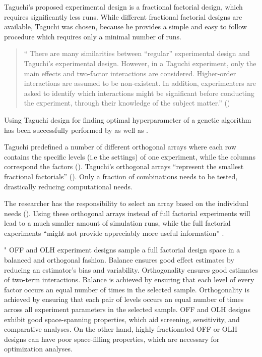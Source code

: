 Taguchi's proposed experimental design is a fractional factorial design, which requires significantly less runs. While different fractional factorial designs are available, Taguchi was chosen, because he provides a simple and easy to follow procedure which requires only a minimal number of runs.

\begin{quote}
	\begin{em}
		\enquote{ There are many similarities between “regular” experimental design and Taguchi's experimental design. However, in a Taguchi experiment, only the main effects and two-factor interactions are considered. Higher-order interactions are assumed to be non-existent. In addition, experimenters are asked to identify which interactions might be significant before conducting the experiment, through their knowledge of the subject matter.} (\cite{yang_design_2009})
	\end{em}
\end{quote}

Using Taguchi design for finding optimal hyperparameter of a genetic algorithm has been successfully performed by \cite{dao_maximising_2016} as well as \cite{naruka_parameter_2019}.

Taguchi predefined a number of different orthogonal arrays where each row contains the specific levels (i.e the settings) of one experiment, while the columns correspond the factors (\cite{li_taguchi_2021}). Taguchi's orthogonal arrays \enquote{represent the smallest fractional factorials} (\cite{roy_primer_1990}). Only a fraction of combinations needs to be tested, drastically reducing computational needs.

The researcher has the responsibility to select an array based on the individual needs (\cite{li_taguchi_2021}).
Using these orthogonal arrays instead of full factorial experiments will lead to a much smaller amount of simulation runs, while the full factorial experiments \enquote{might not provide appreciably more useful information} \cite{roy_primer_1990}.

" OFF and OLH experiment designs sample a full factorial design space in a balanced and orthogonal fashion. Balance ensures good effect estimates by reducing an estimator’s bias and variability. Orthogonality ensures good estimates of two-term interactions. Balance is achieved by ensuring that each level of every factor occurs an equal number of times in the selected sample. Orthogonality is achieved by ensuring that each pair of levels occurs an equal number of times across all experiment parameters in the selected sample. OFF and OLH designs exhibit good space-spanning properties, which aid screening, sensitivity, and comparative analyses. On the other hand, highly fractionated OFF or OLH designs can have poor space-filling properties, which are necessary for optimization analyses.

